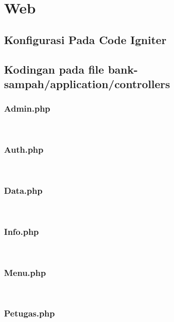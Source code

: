 \section{Web}
\subsection{Konfigurasi Pada Code Igniter}




\subsection{Kodingan pada file bank-sampah/application/controllers}
\subsubsection{Admin.php}
\hfill\\

\subsubsection{Auth.php}
\hfill\\

\subsubsection{Data.php}
\hfill\\

\subsubsection{Info.php}
\hfill\\

\subsubsection{Menu.php}
\hfill\\

\subsubsection{Petugas.php}
\hfill\\

